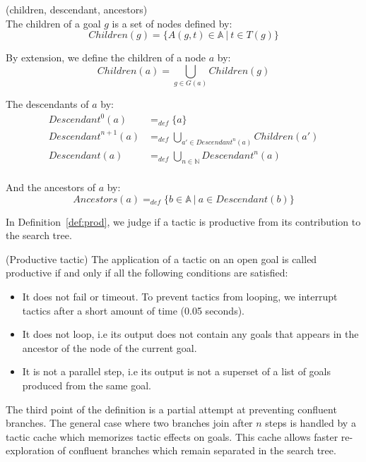 \documentclass[runningheads,a4paper,draft]{svjour3}
\begin{document}
\begin{definition}\label{def:desc}(children, descendant, ancestors)\\
The children of a goal $g$ is a set of nodes defined by:
\[\mathit{Children}(g) = \lbrace A(g,t)\in \mathbb{A}\ |\ t \in T(g) \rbrace\]

By extension, we define the children of a node $a$ by:
\[\mathit{Children}(a) = \bigcup_{g \in G(a)} \mathit{Children}(g) \]

The descendants of $a$ by:
\begin{align*}
\mathit{Descendant}^{0}(a) &=_{def} \lbrace a \rbrace \\
\mathit{Descendant}^{n+1}(a) &=_{def} \bigcup_{a' \in \mathit{Descendant}^{n}(a)}
\mathit{Children}(a') \\
\mathit{Descendant}(a) &=_{def} \bigcup_{n \in \mathbb{N}} \mathit{Descendant}^n(a)\\
\end{align*}

And the ancestors of $a$ by:
\[\mathit{Ancestors}(a) =_{def} \lbrace b \in \mathbb{A} \ | \ a \in
Descendant(b) \rbrace\]

\end{definition}


In Definition~\ref{def:prod}, we judge if a tactic is productive from its 
contribution to the search tree.

\begin{definition}\label{def:prof} (Productive tactic)
The application of a tactic on an open goal is called productive if and only if
all the following conditions are satisfied:
\begin{itemize}
\item It does not fail or timeout. To prevent tactics from looping, we
interrupt tactics after a short amount of time (0.05 seconds).
\item It does not loop, i.e its output does not contain any goals that appears 
in the ancestor of the node of the current goal.
\item It is not a parallel step, i.e its output is not a superset
of a list of goals produced from the same goal.
\end{itemize}

The third point of the definition is a partial attempt at preventing confluent
branches. The general case where two branches join after $n$ steps is handled
by a tactic cache which memorizes tactic effects on goals. This
cache allows faster re-exploration of confluent branches which remain
separated in the search tree.
\end{definition}
\end{document}

